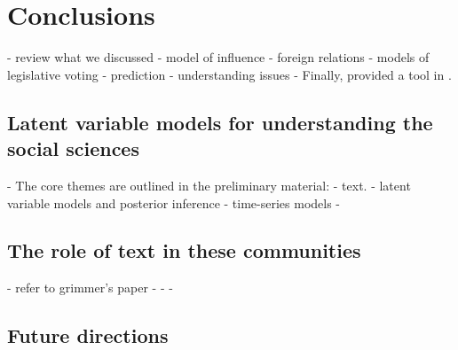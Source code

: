 \chapter{Conclusions}

- review what we discussed
  - model of influence
  - foreign relations
  - models of legislative voting
    - prediction
    - understanding issues
  - Finally, provided a tool in .

\section{Latent variable models for understanding the social sciences}
- The core themes are outlined in the preliminary material:
  - text.
  - latent variable models and posterior inference
  - time-series models
  - 

\section{The role of text in these communities}
- refer to grimmer's paper
  - 
  - 
  - 

\section{Future directions}

